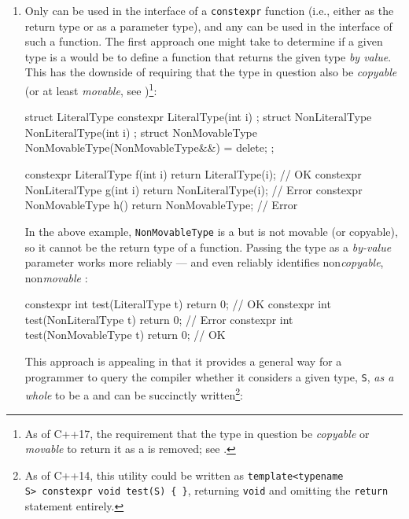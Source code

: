 \begin{enumerate}
\item{Only  can be used in the interface of a \lstinline!constexpr! function (i.e., either as the return type or as a parameter type), and any  can be used in the interface of such a function. The first approach one might take to determine if a given type is a  would be to define a function that returns the given type \emph{by value}. This has the downside of requiring that the type in question also be \emph{copyable} (or at least \emph{movable}, see )\cprotect\footnote{As of C++17, the requirement that the type in question be \emph{copyable} or \emph{movable} to return it as a  is removed; see .}:

\begin{emcppslisting}[emcppsbatch=e9] %
struct LiteralType    { constexpr LiteralType(int i)    {}         };
struct NonLiteralType {           NonLiteralType(int i) {}         };
struct NonMovableType { NonMovableType(NonMovableType&&) = delete; };

constexpr LiteralType    f(int i) { return LiteralType(i);    }  // OK
constexpr NonLiteralType g(int i) { return NonLiteralType(i); }  // Error
constexpr NonMovableType h()      { return NonMovableType{};  }  // Error
\end{emcppslisting}
    

\noindent In the above example, \lstinline!NonMovableType! is a 
but is not movable (or copyable), so it cannot be the return type of a
function. Passing the type as a \emph{by-value} parameter works more
reliably --- and even reliably identifies non\emph{copyable},
non\emph{movable} :

\begin{emcppslisting}[emcppsbatch=e9] %
constexpr int test(LiteralType t)    { return 0; } // OK
constexpr int test(NonLiteralType t) { return 0; } // Error
constexpr int test(NonMovableType t) { return 0; } // OK
\end{emcppslisting}
    
\noindent This approach is appealing in that it provides a general way for a
programmer to query the compiler whether it considers a given type,
\lstinline!S!, \emph{as a whole} to be a  and can be
succinctly written{\cprotect\footnote{As of C++14, this utility could be
written as
  \lstinline!template<typename S>!~\lstinline!constexpr!~\lstinline!void!~\lstinline!test(S)!~\lstinline!{!~\lstinline!}!,
  returning \lstinline!void! and omitting the \lstinline!return! statement
  entirely.}}:

}
\end{enumerate}
